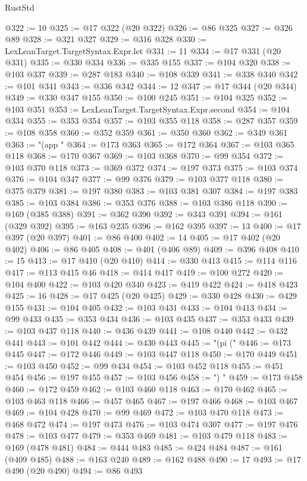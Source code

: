 \begin{lexlean}{RustStd}
\begin{coremodule}
{\begin{coremodule}
{{{{{{{{{{{{{{{{{{{{{{{{{{@322 := 10
@325 := @17 @322 (@20 @322)
@326 := @86 @325
@327 := @326 @89
@328 := @321 @327
@329 := @316 @328
@330 := LexLeanTarget.TargetSyntax.Expr.let
@331 := 11
@334 := @17 @331 (@20 @331)
@335 := @330 @334
@336 := @335 @155
@337 := @104 @320
@338 := @103 @337
@339 := @287 @183
@340 := @108 @339
@341 := @338 @340
@342 := @101 @341
@343 := @336 @342
@344 := 12
@347 := @17 @344 (@20 @344)
@349 := @330 @347 @155
@350 := @100 @245
@351 := @104 @325
@352 := @103 @351
@353 := LexLeanTarget.TargetSyntax.Expr.second
@354 := @104 @334
@355 := @353 @354
@357 := @103 @355 @118
@358 := @287 @357
@359 := @108 @358
@360 := @352 @359
@361 := @350 @360
@362 := @349 @361
@363 := "(app "
@364 := @173 @363
@365 := @172 @364
@367 := @103 @365 @118
@368 := @170 @367
@369 := @103 @368
@370 := @99 @354
@372 := @103 @370 @118
@373 := @369 @372
@374 := @197 @373
@375 := @103 @374
@376 := @104 @347
@377 := @99 @376
@379 := @103 @377 @118
@380 := @375 @379
@381 := @197 @380
@383 := @103 @381 @307
@384 := @197 @383
@385 := @103 @384
@386 := @353 @376
@388 := @103 @386 @118
@390 := @169 (@385 @388)
@391 := @362 @390
@392 := @343 @391
@394 := @161 (@329 @392)
@395 := @163 @235
@396 := @162 @395
@397 := 13
@400 := @17 @397 (@20 @397)
@401 := @86 @400
@402 := 14
@405 := @17 @402 (@20 @402)
@406 := @86 @405
@408 := @401 (@406 @89)
@409 := @396 @408
@410 := 15
@413 := @17 @410 (@20 @410)
@414 := @330 @413
@415 := @114 @116
@417 := @113 @415 @46
@418 := @414 @417
@419 := @100 @272
@420 := @104 @400
@422 := @103 @420 @340
@423 := @419 @422
@424 := @418 @423
@425 := 16
@428 := @17 @425 (@20 @425)
@429 := @330 @428
@430 := @429 @155
@431 := @104 @405
@432 := @103 @431
@433 := @104 @413
@434 := @99 @433
@435 := @353 @434
@436 := @103 @435
@437 := @353 @433
@439 := @103 @437 @118
@440 := @436 @439
@441 := @108 @440
@442 := @432 @441
@443 := @101 @442
@444 := @430 @443
@445 := "(pi ("
@446 := @173 @445
@447 := @172 @446
@449 := @103 @447 @118
@450 := @170 @449
@451 := @103 @450
@452 := @99 @434
@454 := @103 @452 @118
@455 := @451 @454
@456 := @197 @455
@457 := @103 @456
@458 := ") "
@459 := @173 @458
@460 := @172 @459
@462 := @103 @460 @118
@463 := @170 @462
@465 := @103 @463 @118
@466 := @457 @465
@467 := @197 @466
@468 := @103 @467
@469 := @104 @428
@470 := @99 @469
@472 := @103 @470 @118
@473 := @468 @472
@474 := @197 @473
@476 := @103 @474 @307
@477 := @197 @476
@478 := @103 @477
@479 := @353 @469
@481 := @103 @479 @118
@483 := @169 (@478 @481)
@484 := @444 @483
@485 := @424 @484
@487 := @161 (@409 @485)
@488 := @163 @240
@489 := @162 @488
@490 := 17
@493 := @17 @490 (@20 @490)
@494 := @86 @493
}}}}}}}}}}}}}}}}}}}}}}}}}}
\end{coremodule}}
\end{coremodule}
\end{lexlean}

